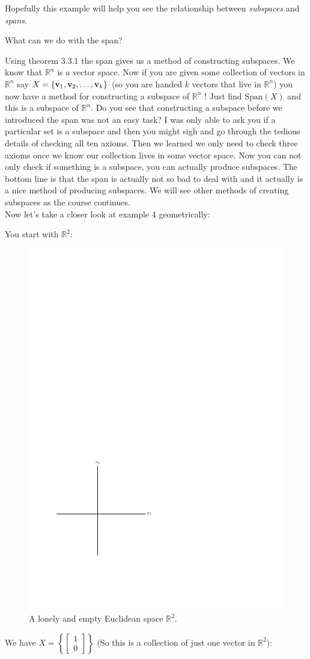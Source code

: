\documentclass[12pt]{article}
\begin{document}
Hopefully this example will help you see the relationship between {\it subspaces} and {\it spans}.  

\begin{center} What can we do with the span? \end{center}

Using theorem 3.3.1 the span gives us a method of constructing subspaces.  We know that $\mathbb{R}^n$ is a vector space.  Now if you are given some collection of vectors in $\mathbb{R}^n$ say $X=\{{\bf v}_1,{\bf v}_2,\ldots,{\bf v}_k \}$ (so you are handed $k$ vectors that live in $\mathbb{R}^n$)  you now have a method for constructing a subspace of $\mathbb{R}^n$ !  Just find $\text{Span}(X)$ and this is a subspace of $\mathbb{R}^n$.  Do you see that constructing a subspace before we introduced the span was not an easy task?  I was only able to ask you if a particular set is a subspace and then you might sigh and go through the tedious details of checking all ten axioms.  Then we learned we only need to check three axioms once we know our collection lives in some vector space.  Now you can not only check if something is a subspace,  you can actually produce subspaces.  The bottom line is that the span is actually not so bad to deal with and it actually is a nice method of producing subspaces.  We will see other methods of creating subspaces as the course continues.\\

Now let's take a closer look at example 4 geometrically:

You start with $\mathbb{R}^2$:

\begin{figure}[h!]
\begin{center} 
\includegraphics[width=0.25 \textwidth]{l19comim1}
\caption{A lonely and empty Euclidean space $\mathbb{R}^2$.}
\end{center}
\end{figure} 

We have $X= \left\{ \left[ \begin{array}{c} 1  \\ 0  \end{array} \right] \right\}$ (So this is a collection of just one vector in $\mathbb{R}^2$):
\end{document}
